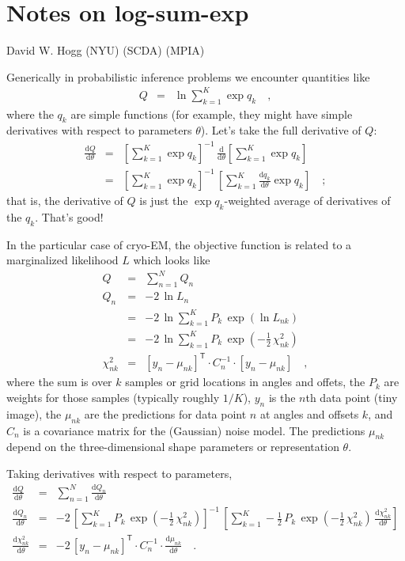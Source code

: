 \documentclass[12pt]{article}
\newcommand{\like}{L}
\newcommand{\dd}{\mathrm{d}}
\newcommand{\inverse}{^{-1}}
\newcommand{\transpose}{^{\mathsf{T}}}
\begin{document}
\section*{Notes on log-sum-exp}
\noindent
David W. Hogg (NYU) (SCDA) (MPIA)

\bigskip

Generically in probabilistic inference problems we encounter quantities like
\begin{eqnarray}
  Q
  &=& \ln\sum_{k=1}^K\exp q_k
  \quad,
\end{eqnarray}
where the $q_k$ are simple functions (for example, they might have simple
derivatives with respect to parameters $\theta$).
Let's take the full derivative of $Q$:
\begin{eqnarray}
  \frac{\dd Q}{\dd\theta}
  &=& \left[\sum_{k=1}^K\exp q_k\right]\inverse
      \,\frac{\dd}{\dd\theta}\left[\sum_{k=1}^K\exp q_k\right] \\
  &=& \left[\sum_{k=1}^K\exp q_k\right]\inverse
      \,\left[\sum_{k=1}^K\frac{\dd q_k}{\dd\theta}\exp q_k\right]
  \quad;
\end{eqnarray}
that is, the derivative of $Q$ is just the $\exp q_k$-weighted average
of derivatives of the $q_k$.
That's good!

In the particular case of cryo-EM, the objective function is related
to a marginalized likelihood $\like$ which looks like
\begin{eqnarray}
  Q
  &=&
  \sum_{n=1}^N Q_n \\
  Q_n
  &=& -2\,\ln\like_n \\
  &=& -2\,\ln\sum_{k=1}^K P_k\,\exp(\ln\like_{nk}) \\
  &=& -2\,\ln\sum_{k=1}^K P_k\,\exp(-\frac{1}{2}\,\chi^2_{nk}) \\
  \chi^2_{nk}
  &=& [y_n - \mu_{nk}]\transpose\cdot C_n\inverse\cdot [y_n - \mu_{nk}]
  \quad,
\end{eqnarray}
where the sum is over $k$ samples or grid locations in angles and
offets, the $P_k$ are weights for those samples (typically roughly
$1/K$), $y_n$ is the $n$th data point (tiny image), the $\mu_{nk}$ are
the predictions for data point $n$ at angles and offsets $k$, and
$C_n$ is a covariance matrix for the (Gaussian) noise model.
The predictions $\mu_{nk}$ depend on the three-dimensional shape
parameters or representation $\theta$.

Taking derivatives with respect to parameters,
\begin{eqnarray}
  \frac{\dd Q}{\dd\theta}
  &=&
  \sum_{n=1}^N \frac{\dd Q_n}{\dd\theta} \\
  \frac{\dd Q_n}{\dd\theta}
  &=& -2\,\left[\sum_{k=1}^K P_k\,\exp(-\frac{1}{2}\,\chi^2_{nk})\right]\inverse
        \,\left[\sum_{k=1}^K -\frac{1}{2}\,P_k\,\exp(-\frac{1}{2}\,\chi^2_{nk})\,\frac{\dd\chi^2_{nk}}{\dd\theta}\right] \\
  \frac{\dd\chi^2_{nk}}{\dd\theta}
  &=& -2\,[y_n - \mu_{nk}]\transpose\cdot C_n\inverse\cdot\frac{\dd\mu_{nk}}{\dd\theta}
  \quad.
\end{eqnarray}
\end{document}
